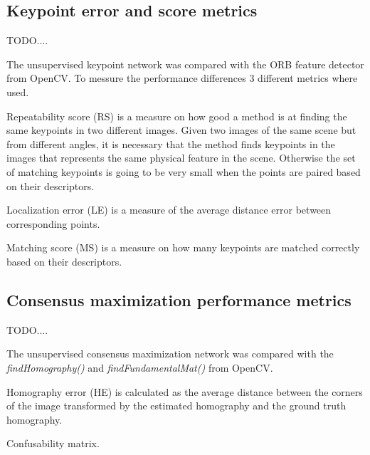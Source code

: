 \subsection{Keypoint error and score metrics}

TODO....

The unsupervised keypoint network was compared with the ORB feature detector from OpenCV. To messure the performance differences 3 different metrics where used.

Repeatability score (RS) is a measure on how good a method is at finding the same keypoints in two different images. Given two images of the same scene but from different angles, it is necessary that the method finds keypoints in the images that represents the same physical feature in the scene. Otherwise the set of matching keypoints is going to be very small when the points are paired based on their descriptors.

Localization error (LE) is a measure of the average distance error between corresponding points.

Matching score (MS) is a measure on how many keypoints are matched correctly based on their descriptors.

\subsection{Consensus maximization performance metrics}

TODO....

The unsupervised consensus maximization network was compared with the \textit{findHomography()} and \textit{findFundamentalMat()} from OpenCV.

Homography error (HE) is calculated as the average distance between the corners of the image transformed by the estimated homography and the ground truth homography.

Confusability matrix.
